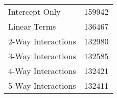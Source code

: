 \begin{table}[ht]
\centering
\begin{tabular}{ll}
  \hline
  \hline
Intercept Only & 159942 \\ 
  Linear Terms & 136467 \\ 
  2-Way Interactions & 132980 \\ 
  3-Way Interactions & 132585 \\ 
  4-Way Interactions & 132421 \\ 
  5-Way Interactions & 132411 \\ 
   \hline
\end{tabular}
\end{table}
